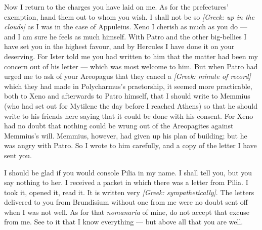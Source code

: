  Now I return to the charges you have laid on me. \textdagger{}As for the prefectures' exemption,\textdagger{} hand them out to whom you wish. I shall not be so \textit{[Greek: up in the clouds]} as I was in the case of Appuleius. Xeno I cherish as much as you do --- and I am sure he feels as much himself. With Patro and the other big-bellies I have set you in the highest favour, and by Hercules I have done it on your deserving. For Ister told me you had written to him that the matter had been my concern out of his letter --- which was most welcome to him. But when Patro had urged me to ask of your Areopagus that they cancel a \textit{[Greek: minute of record]} which they had made in Polycharmus's praetorship, it seemed more practicable, both to Xeno and afterwards to Patro himself, that I should write to Memmius (who had set out for Mytilene the day before I reached Athens) so that he should write to his friends here saying that it could be done with his consent. For Xeno had no doubt that nothing could be wrung out of the Areopagites against Memmius's will. Memmius, however, had given up his plan of building; but he was angry with Patro. So I wrote to him carefully, and a copy of the letter I have sent you.

 I should be glad if you would console Pilia in my name. I shall tell you, but you say nothing to her. I received a packet in which there was a letter from Pilia. I took it, opened it, read it. It is written very \textit{[Greek: sympathetically]}. The letters delivered to you from Brundisium without one from me were no doubt sent off when I was not well. As for that \textdagger{}\textit{nomanaria}\textdagger{} of mine, do not accept that excuse from me. See to it that I know everything --- but above all that you are well.
